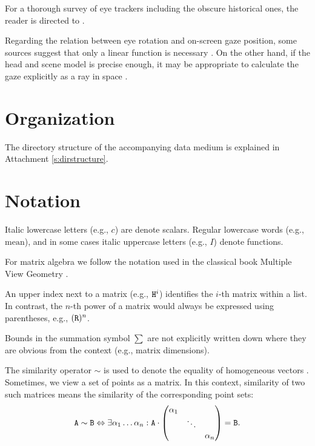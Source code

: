 
For a thorough survey of eye trackers including the obscure historical ones, the reader is directed to \cite{hansen10}.

Regarding the relation between eye rotation and on-screen gaze position, some sources suggest that only a linear function is necessary \cite{zhu12}.
On the other hand, if the head and scene model is precise enough, it may be appropriate to calculate the gaze explicitly as a ray in space \cite{wang16}.

\section{Organization}

The directory structure of the accompanying data medium is explained in Attachment \ref{s:dirstructure}.

\section{Notation}

Italic lowercase letters (e.g., $c$) are denote scalars.
Regular lowercase words (e.g., $\mathrm{mean}$), and in some cases italic uppercase letters (e.g., $I$) denote functions.

For matrix algebra we follow the notation used in the classical book Multiple View Geometry \cite{hartley03}.




\printglossary[type=symbolslist,style=notationlong]   %

\glsaddall

An upper index next to a matrix (e.g., $\mathtt{H}^i$) identifies the $i$-th matrix within a list.
In contrast, the $n$-th power of a matrix would always be expressed using parentheses, e.g., $(\mathtt{R})^n$.

Bounds in the summation symbol $\sum$ are not explicitly written down where they are obvious from the context (e.g., matrix dimensions).

The similarity operator $\sim$ is used to denote the equality of homogeneous vectors \todo{\dots}.
Sometimes, we view a set of points \todo{\dots} as a matrix.
In this context, similarity of two such matrices means the similarity of the corresponding point sets:
\begin{equation}
\mathtt{A} \sim \mathtt{B} \Leftrightarrow \exists \alpha_1 \dots \alpha_n : \mathtt{A} \cdot \begin{pmatrix}
 \alpha_1 & & \\
  & \ddots & \\
 & & \alpha_n
 \end{pmatrix} = \mathtt{B}.
\end{equation}
